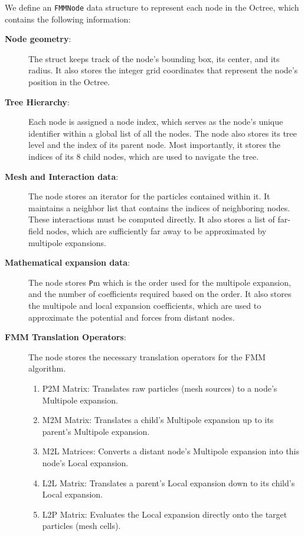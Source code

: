 We define an \texttt{FMMNode} data structure to represent each node in the Octree, which contains the following information:
\begin{description}
    \item [\textbf{Node geometry}:] The struct keeps track of the node's bounding box, its center, and its radius. It also stores the integer grid coordinates that represent the node's position in the Octree.
    \item [\textbf{Tree Hierarchy}:] Each node is assigned a node index, which serves as the node's unique identifier within a global list of all the nodes. The node also stores its tree level and the index of its parent node. Most importantly, it stores the indices of its 8 child nodes, which are used to navigate the tree.
    \item [\textbf{Mesh and Interaction data}:] The node stores an iterator for the particles contained within it. It maintains a neighbor list that contains the indices of neighboring nodes. These interactions must be computed directly. It also stores a list of far-field nodes, which are sufficiently far away to be approximated by multipole expansions.
    \item [\textbf{Mathematical expansion data}:] The node stores \texttt{P}m which is the order used for the multipole expansion, and the number of coefficients required based on the order. It also stores the multipole and local expansion coefficients, which are used to approximate the potential and forces from distant nodes.
    \item [\textbf{FMM Translation Operators}:] The node stores the necessary translation operators for the FMM algorithm. 
    \begin{enumerate}
        \item \ac{P2M} Matrix: Translates raw particles (mesh sources) to a node's Multipole expansion.
        \item \ac{M2M} Matrix: Translates a child's Multipole expansion up to its parent's Multipole expansion.
        \item \ac{M2L} Matrices: Converts a distant node's Multipole expansion into this node's Local expansion.
        \item \ac{L2L} Matrix: Translates a parent's Local expansion down to its child's Local expansion.
        \item \ac{L2P} Matrix: Evaluates the Local expansion directly onto the target particles (mesh cells).
    \end{enumerate}
\end{description}

